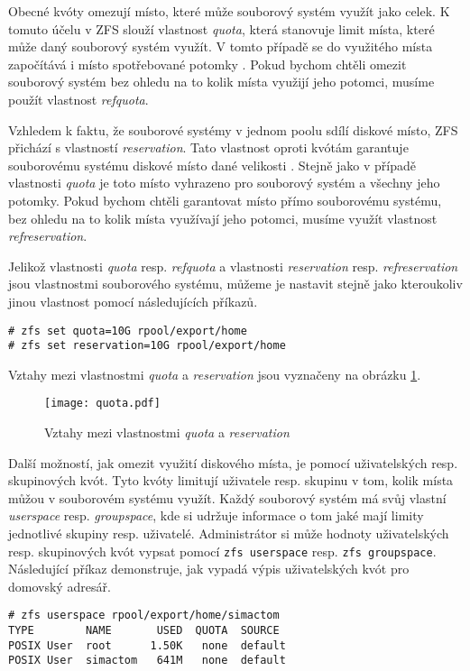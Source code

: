 Obecné kvóty omezují místo, které může souborový systém využít jako celek. K tomuto účelu v ZFS slouží vlastnost \emph{quota}, která stanovuje limit místa, které může daný souborový systém využít. V tomto případě se do využitého místa započítává i místo spotřebované potomky \cite{quotas}. Pokud bychom chtěli omezit souborový systém bez ohledu na to kolik místa využijí jeho potomci, musíme použít vlastnost \emph{refquota}.

Vzhledem k faktu, že souborové systémy v jednom poolu sdílí diskové místo, ZFS přichází s vlastností \emph{reservation}. Tato vlastnost oproti kvótám garantuje souborovému systému diskové místo dané velikosti \cite{quotas}. Stejně jako v případě vlastnosti \emph{quota} je toto místo vyhrazeno pro souborový systém a všechny jeho potomky. Pokud bychom chtěli garantovat místo přímo souborovému systému, bez ohledu na to kolik místa využívají jeho potomci, musíme využít vlastnost \emph{refreservation}.

Jelikož vlastnosti \emph{quota} resp. \emph{refquota} a vlastnosti \emph{reservation} resp. \emph{refreservation} jsou vlastnostmi souborového systému, můžeme je nastavit stejně jako kteroukoliv jinou vlastnost pomocí následujících příkazů.
\begin{verbatim}
# zfs set quota=10G rpool/export/home
# zfs set reservation=10G rpool/export/home
\end{verbatim}

Vztahy mezi vlastnostmi \emph{quota} a \emph{reservation} jsou vyznačeny na obrázku \ref{quotavsreserv}.
\begin{figure}[h]
    \caption{Vztahy mezi vlastnostmi \emph{quota} a \emph{reservation}}
    \label{quotavsreserv}
    \centering
    \texttt{[image: quota.pdf]}
\end{figure}

Další možností, jak omezit využití diskového místa, je pomocí uživatelských resp. skupinových kvót. Tyto kvóty limitují uživatele resp. skupinu v tom, kolik místa můžou v souborovém systému využít. Každý souborový systém má svůj vlastní \emph{userspace} resp. \emph{groupspace}, kde si udržuje informace o tom jaké mají limity jednotlivé skupiny resp. uživatelé.
Administrátor si může hodnoty uživatelských resp. skupinových kvót vypsat pomocí \verb|zfs userspace| resp. \verb|zfs groupspace|. Následující příkaz demonstruje, jak vypadá výpis uživatelských kvót pro domovský adresář.
\begin{verbatim}
# zfs userspace rpool/export/home/simactom
TYPE        NAME       USED  QUOTA  SOURCE
POSIX User  root      1.50K   none  default
POSIX User  simactom   641M   none  default
\end{verbatim}

